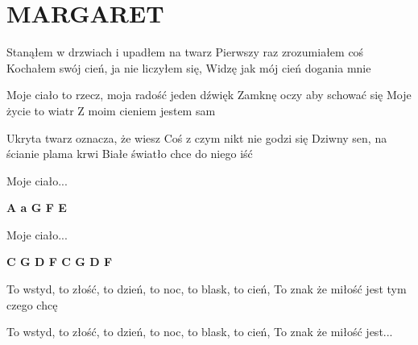 \documentclass[../../../songbook.tex]{subfiles}
\begin{document}
\TabPositions{9cm} %
\section*{MARGARET}
{}
\vspace{0.5cm}
Stanąłem w drzwiach i upadłem na twarz		 \newline
Pierwszy raz zrozumiałem coś				 \newline
Kochałem swój cień, ja nie liczyłem się, \newline
Widzę jak mój cień dogania mnie			\newline

\-\hspace{1cm} Moje ciało to rzecz, moja radość jeden dźwięk	 \newline
\-\hspace{1cm} Zamknę oczy aby schować się						 \newline
\-\hspace{1cm} Moje życie to wiatr								 \newline
\-\hspace{1cm} Z moim cieniem jestem sam						 \newline

Ukryta twarz oznacza, że wiesz \newline
Coś z czym nikt nie godzi się \newline
Dziwny sen, na ścianie plama krwi \newline
Białe światło chce do niego iść \newline

\-\hspace{1cm} Moje ciało... \newline

{\color{red}\textbf{A a G F E} } \newline

\-\hspace{1cm} Moje ciało... \newline

{\color{red}\textbf{C G D F C G D F} } \newline

To wstyd, to złość, to dzień, to noc, to blask, to cień,	 \newline
To znak że miłość jest tym czego chcę						 \newline

To wstyd, to złość, to dzień, to noc, to blask, to cień,  \newline
To znak że miłość jest... \newline
\end{document}

